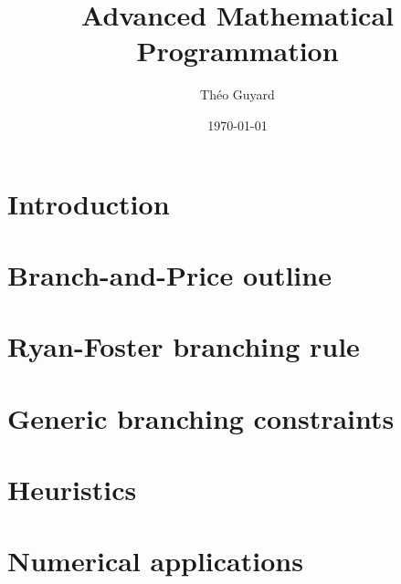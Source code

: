 \documentclass{article}
\title{Advanced Mathematical Programmation}
\author{Théo Guyard}
\date{\today}
\begin{document}


\tableofcontents
\newpage

\section{Introduction}



\newpage

\section{Branch-and-Price outline}

\newpage

\section{Ryan-Foster branching rule}
\label{ryan-foster}


\newpage

\section{Generic branching constraints}
\label{generic}


\newpage

\section{Heuristics}


\newpage

\section{Numerical applications}



\newpage

\printbibliography
\end{document}
